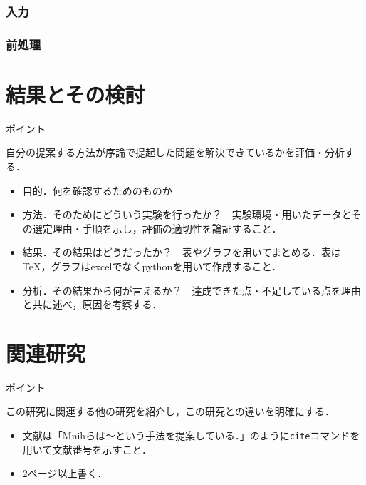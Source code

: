 \documentclass[a4j,11pt,report]{jsbook}
\newcommand{\point}[1]{
\begin{itembox}[l]{ポイント}
  #1
\end{itembox}
}
\begin{document}
\subsection{入力}
\subsection{前処理}
\subsection{}
\subsection{}
\subsection{}
\subsection{}






\chapter{結果とその検討 \label{ch:result}}

\point{
自分の提案する方法が序論で提起した問題を解決できているかを評価・分析する．
\begin{itemize}
  \item 目的．何を確認するためのものか
  \item 方法．そのためにどういう実験を行ったか？　実験環境・用いたデータとその選定理由・手順を示し，評価の適切性を論証すること．
  \item 結果．その結果はどうだったか？　表やグラフを用いてまとめる．表はTeX，グラフはexcelでなくpythonを用いて作成すること．
  \item 分析．その結果から何が言えるか？　達成できた点・不足している点を理由と共に述べ，原因を考察する．
\end{itemize}
}

\chapter{関連研究\label{ch:relatedwork}}
\point{
この研究に関連する他の研究を紹介し，この研究との違いを明確にする．
\begin{itemize}
  \item 文献は「Mnihらは～という手法を提案している\cite{Mnih15}．」のように\texttt{cite}コマンドを用いて文献番号を示すこと．
  \item 2ページ以上書く．
\end{itemize}
}
\end{document}
